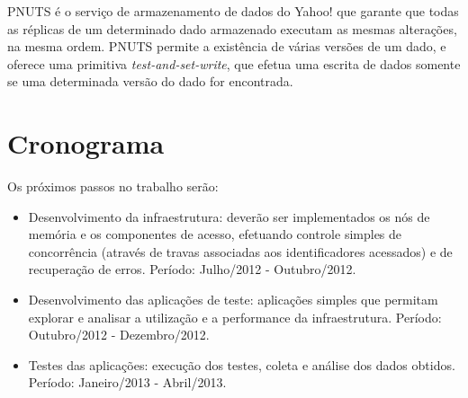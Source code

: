 \documentclass[11pt,twoside,a4paper]{book}
\renewcommand{\chaptermark}[1]{\markboth{\MakeUppercase{#1}}{}}
\begin{document}
PNUTS é o serviço de armazenamento de dados do Yahoo! que garante que todas as réplicas de um determinado dado armazenado executam as mesmas alterações, na mesma ordem. PNUTS permite a existência de várias versões de um dado, e oferece uma primitiva \emph{test-and-set-write}, que efetua uma escrita de dados somente se uma determinada versão do dado for encontrada.


\chapter{Cronograma}
\label{chap:cronograma}
Os próximos passos no trabalho serão:

\begin{itemize}
\item Desenvolvimento da infraestrutura: deverão ser implementados os nós de memória e os componentes de acesso, efetuando controle simples de concorrência (através de travas associadas aos identificadores acessados) e de recuperação de erros. Período: Julho/2012 - Outubro/2012.
\item Desenvolvimento das aplicações de teste: aplicações simples que permitam explorar e analisar a utilização e a performance da infraestrutura. Período: Outubro/2012 - Dezembro/2012.
\item Testes das aplicações: execução dos testes, coleta e análise dos dados obtidos. Período: Janeiro/2013 - Abril/2013.
\end{itemize}

\renewcommand{\chaptermark}[1]{\markboth{\MakeUppercase{\appendixname\ \thechapter}} {\MakeUppercase{#1}} }
\fancyhead[RE,LO]{}
\appendix

% 

\backmatter \singlespacing   %

\end{document}
